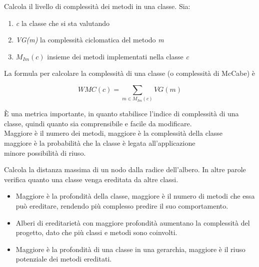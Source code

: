 {    \newpage
    Calcola il livello di complessità dei metodi in una classe.
    Sia:
    \begin{enumerate}
        \item \textit{c} la classe che si sta valutando
        \item \textit{VG(m)} la complessità ciclomatica del metodo \textit{m}
        \item \(\textit{M}_{\textit{Im}} (c)\) insieme dei metodi implementati nella classe \textit{c}
    \end{enumerate}
    La formula per calcolare la complessità di una classe (o complessità di McCabe) è
    \vspace{-1cm}
    \begin{center}
        \begin{equation}
            WMC(c) = \sum_{m \in M_{Im} (c)} VG(m)
        \end{equation}
    \end{center}
    \`{E} una metrica importante, in quanto stabilisce l'indice di complessità di una classe, quindi quanto sia comprensibile
    e facile da modificare.\\
    Maggiore è il numero dei metodi, maggiore è la complessità della classe\\ \Rightarrow maggiore è la probabilità
    che la classe è legata all'applicazione\\ \Rightarrow minore possibilità di riuso.

    Calcola la distanza massima di un nodo dalla radice dell'albero. In altre parole verifica quanto una classe
    venga ereditata da altre classi.
    \begin{itemize}
        \item Maggiore è la profondità della classe, maggiore è il numero di metodi che essa può ereditare, rendendo più 
        complesso predire il suo comportamento.
        \item Alberi di ereditarietà con maggiore profondità aumentano la complessità del progetto, dato che più classi e
        metodi sono coinvolti.
        \item Maggiore è la profondità di una classe in una gerarchia, maggiore è il riuso potenziale dei metodi ereditati.
    \end{itemize}

}
